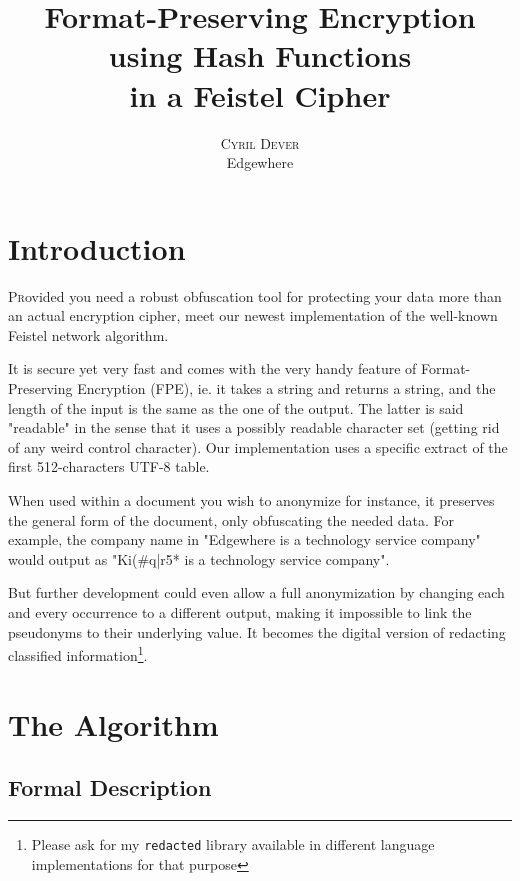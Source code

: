 \documentclass[twoside,twocolumn]{article}
\title{Format-Preserving Encryption \\using Hash Functions \\in a Feistel Cipher} %
\author{%
    \textsc{Cyril Dever}\\ %
    \normalsize Edgewhere \\ %
}
\date{\DTMusedate{thedate}}
\theoremstyle{definition}
\theoremstyle{remark}
\begin{document}
\maketitle


\section{Introduction}

\lettrine[nindent=0em,lines=3]{P}rovided you need a robust obfuscation tool for protecting your data more than an actual encryption cipher, meet our 
newest implementation of the well-known Feistel network algorithm.

It is secure yet very fast and comes with the very handy feature of Format-Preserving Encryption (FPE), ie. it takes a string and returns a string, 
and the length of the input is the same as the one of the output. The latter is said "readable" in the sense that it uses a possibly readable 
character set (getting rid of any weird control character). Our implementation uses a specific extract of the first 512-characters UTF-8 table.

When used within a document you wish to anonymize for instance, it preserves the general form of the document, only obfuscating the needed data.
For example, the company name in "Edgewhere is a technology service company" would output as "Ki(\#q|r5* is a technology service company".

But further development could even allow a full anonymization by changing each and every occurrence to a different output, making it impossible to link 
the pseudonyms to their underlying value. It becomes the digital version of redacting classified information\footnote{Please ask for my 
\texttt{redacted} library available in different language implementations for that purpose}.

\section{The Algorithm}

\subsection{Formal Description}
\end{document}
